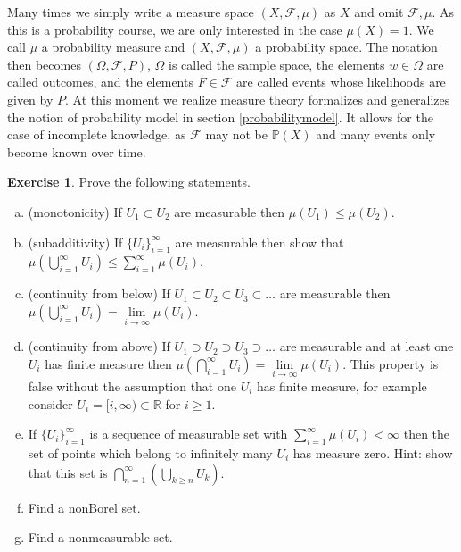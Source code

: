 \documentclass[12pt]{amsart}
\theoremstyle{definition}
\newtheorem{exercise}[theorem]{Exercise}
\begin{document}
Many times we simply write a measure space $(X, \mathcal{F}, \mu)$ as $X$ and omit $\mathcal{F}, \mu$. As this is a probability course, we are only interested in the case $\mu(X) = 1$. We call $\mu$ a probability measure and $(X, \mathcal{F}, \mu)$ a probability space. The notation then becomes $(\Omega, \mathcal{F}, P)$, $\Omega$ is called the sample space, the elements $w \in \Omega$ are called outcomes, and the elements $F \in \mathcal{F}$ are called events whose likelihoods are given by $P$. At this moment we realize measure theory formalizes and generalizes the notion of probability model in section \ref{probabilitymodel}. It allows for the case of incomplete knowledge, as $\mathcal{F}$ may not be $\mathbb{P}(X)$ and many events only become known over time.

\begin{exercise} \label{statements_about_measure} Prove the following statements.
\begin{enumerate}[a.]
\item (monotonicity) If $U_1 \subset U_2$ are measurable then $\mu(U_1) \leq \mu(U_2)$.
\item (subadditivity) If $\{U_i\}_{i = 1}^{\infty}$ are measurable then show that $\mu \left(\bigcup\limits_{i = 1}^{\infty} U_i \right) \leq \sum\limits_{i = 1}^{\infty} \mu(U_i)$.
\item (continuity from below) If $U_1 \subset U_2 \subset U_3 \subset \dots$ are measurable then $\mu\left(\bigcup\limits_{i=1}^{\infty} U_i\right) = \lim\limits_{i \rightarrow \infty} \mu(U_i)$.
\item (continuity from above) If $U_1 \supset U_2 \supset U_3 \supset \dots$ are measurable and at least one $U_i$ has finite measure then $\mu\left(\bigcap\limits_{i=1}^{\infty} U_i\right) = \lim\limits_{i \rightarrow \infty} \mu(U_i)$. This property is false without the assumption that one $U_i$ has finite measure, for example consider $U_i = [i, \infty) \subset \mathbb{R}$ for $i \geq 1$.
\item If $\{U_i\}_{i=1}^{\infty}$ is a sequence of measurable set with $\sum\limits_{i=1}^{\infty}\mu(U_i) < \infty$ then the set of points which belong to infinitely many $U_i$ has measure zero. Hint: show that this set is $\bigcap\limits_{n=1}^{\infty} (\bigcup\limits_{k \geq n} U_k)$.
\item Find a nonBorel set.
\item Find a nonmeasurable set.
\end{enumerate}
\end{exercise}
\end{document}

